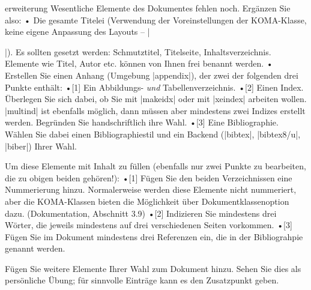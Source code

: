 \documentclass[
	blatt=9,
	ausgabe=12.\,06.\,2010,
	rückgabe=18.\,06.\,2010
]{lcourse-hd}
\begin{document}
\begin{exercise}[
  name={Erweiterung},
  punkte=6,
  abgabe = \begin{itemize}\item {Den gesamten Quellcode als Email (mehrere Dateien). Bitte überlegen Sie sich, falls möglich, eine Archivierung (zip o.\,ä.), um den Transfer zu erleichtern.}
\item Fertiges Dokument (pdf) per Mail.
\item {Ausdruck von Inhaltsverzeichnis, erster Textseite sowie Index bzw. Bibliographie. Also drei repräsentative Seiten Ihres Dokumentes.}
\item Handschriftliche Begründung für die Indexwahl.
\end{itemize}
]{erweiterung}
Wesentliche Elemente des Dokumentes fehlen noch. Ergänzen Sie also:
• Die gesamte Titelei (Verwendung der Voreinstellungen der KOMA-Klasse, keine eigene Anpassung des Layouts – |\maketitle|). Es sollten gesetzt werden: 
Schmutztitel, Titelseite, Inhaltsverzeichnis. Elemente wie Titel, Autor etc. können von Ihnen frei benannt werden.
• Erstellen Sie einen Anhang (Umgebung |appendix|), der zwei der folgenden drei Punkte enthält:
•[1] Ein Abbildungs- \emph{und} Tabellenverzeichnis.
•[2] Einen Index. Überlegen Sie sich dabei, ob Sie mit |makeidx| oder mit |xeindex| arbeiten wollen. |multind| ist ebenfalls möglich, dann müssen aber mindestens zwei Indizes erstellt werden. Begründen Sie handschriftlich ihre Wahl.
•[3] Eine Bibliographie. Wählen Sie dabei einen Bibliographiestil und ein Backend (|bibtex|, |bibtex8/u|, |biber|) Ihrer Wahl.

Um diese Elemente mit Inhalt zu füllen (ebenfalls nur zwei Punkte zu bearbeiten, die zu obigen beiden gehören!):
•[1] Fügen Sie den beiden Verzeichnissen eine Nummerierung hinzu. Normalerweise werden diese Elemente nicht nummeriert, aber die KOMA-Klassen bieten die Möglichkeit über Dokumentklassenoption dazu. (Dokumentation, Abschnitt 3.9)
•[2] Indizieren Sie mindestens drei Wörter, die jeweils mindestens auf drei verschiedenen Seiten vorkommen.
•[3] Fügen Sie im Dokument mindestens drei Referenzen ein, die in der Bibliograhpie genannt werden.


Fügen Sie weitere Elemente Ihrer Wahl zum Dokument hinzu. Sehen Sie dies als persönliche Übung; für sinnvolle Einträge kann es den Zusatzpunkt geben.
\end{exercise}
\end{document}
